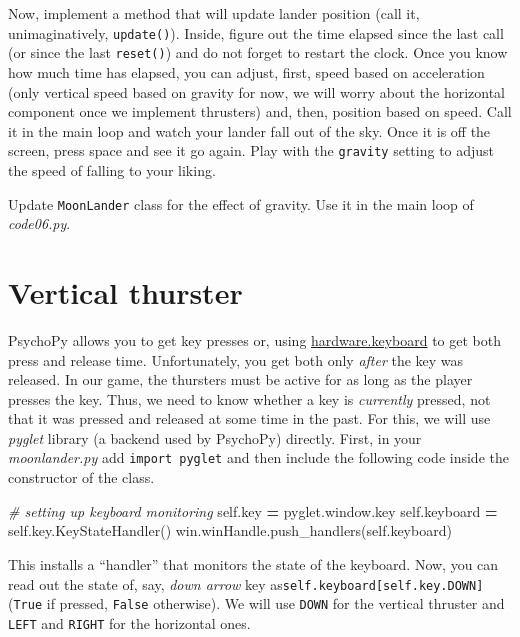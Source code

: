 \documentclass[
]{book}
\newenvironment{Shaded}{\begin{snugshade}}{\end{snugshade}}
\newcommand{\CommentTok}[1]{\textcolor[rgb]{0.56,0.35,0.01}{\textit{#1}}}
\newcommand{\NormalTok}[1]{#1}
\newcommand{\OperatorTok}[1]{\textcolor[rgb]{0.81,0.36,0.00}{\textbf{#1}}}
\newcommand{\VariableTok}[1]{\textcolor[rgb]{0.00,0.00,0.00}{#1}}
\begin{document}
Now, implement a method that will update lander position (call it, unimaginatively, \texttt{update()}). Inside, figure out the time elapsed since the last call (or since the last \texttt{reset()}) and do not forget to restart the clock. Once you know how much time has elapsed, you can adjust, first, speed based on acceleration (only vertical speed based on gravity for now, we will worry about the horizontal component once we implement thrusters) and, then, position based on speed. Call it in the main loop and watch your lander fall out of the sky. Once it is off the screen, press space and see it go again. Play with the \texttt{gravity} setting to adjust the speed of falling to your liking.

Update \texttt{MoonLander} class for the effect of gravity.
Use it in the main loop of \emph{code06.py}.

\hypertarget{vertical-thurster}{%
\section{Vertical thurster}\label{vertical-thurster}}

PsychoPy allows you to get key presses or, using \href{https://www.psychopy.org/api/hardware/keyboard.html}{hardware.keyboard} to get both press and release time. Unfortunately, you get both only \emph{after} the key was released. In our game, the thursters must be active for as long as the player presses the key. Thus, we need to know whether a key is \emph{currently} pressed, not that it was pressed and released at some time in the past. For this, we will use \emph{pyglet} library (a backend used by PsychoPy) directly. First, in your \emph{moonlander.py} add \texttt{import\ pyglet} and then include the following code inside the constructor of the class.

\begin{Shaded}
\begin{Highlighting}[]
\CommentTok{\# setting up keyboard monitoring}
\VariableTok{self}\NormalTok{.key }\OperatorTok{=}\NormalTok{ pyglet.window.key}
\VariableTok{self}\NormalTok{.keyboard }\OperatorTok{=} \VariableTok{self}\NormalTok{.key.KeyStateHandler()}
\NormalTok{win.winHandle.push\_handlers(}\VariableTok{self}\NormalTok{.keyboard)}
\end{Highlighting}
\end{Shaded}

This installs a ``handler'' that monitors the state of the keyboard. Now, you can read out the state of, say, \emph{down arrow} key as\texttt{self.keyboard{[}self.key.DOWN{]}} (\texttt{True} if pressed, \texttt{False} otherwise). We will use \texttt{DOWN} for the vertical thruster and \texttt{LEFT} and \texttt{RIGHT} for the horizontal ones.
\end{document}
